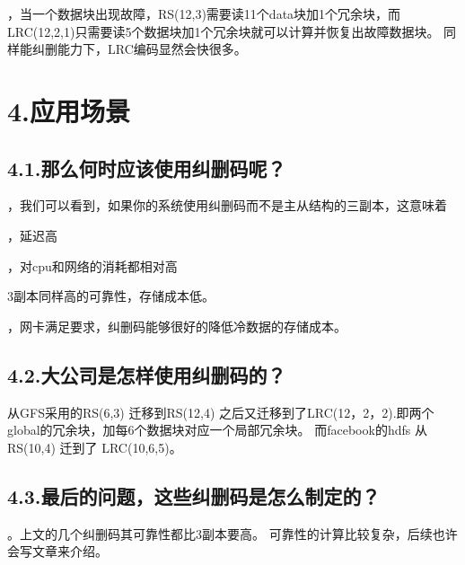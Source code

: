\documentclass{article}
\begin{document}
，当一个数据块出现故障，RS(12,3)需要读11个data块加1个冗余块，而LRC(12,2,1)只需要读5个数据块加1个冗余块就可以计算并恢复出故障数据块。
同样能纠删能力下，LRC编码显然会快很多。%

\section{4.\hspace*{0.5em}应用场景}\label{section}%

\subsection{4.1.\hspace*{0.5em}那么何时应该使用纠删码呢？}\label{section}%

，我们可以看到，如果你的系统使用纠删码而不是主从结构的三副本，这意味着%

\begin{itemize}[noitemsep,topsep=\mdcompacttopsep]%

，延迟高%

，对cpu和网络的消耗都相对高%

3副本同样高的可靠性，存储成本低。%
\end{itemize}%

，网卡满足要求，纠删码能够很好的降低冷数据的存储成本。%

\subsection{4.2.\hspace*{0.5em}大公司是怎样使用纠删码的？}\label{section}%

 从GFS采用的RS(6,3) 迁移到RS(12,4) 之后又迁移到了LRC(12，2，2).即两个global的冗余块，加每6个数据块对应一个局部冗余块。
而facebook的hdfs 从 RS(10,4) 迁到了 LRC(10,6,5)。%

\subsection{4.3.\hspace*{0.5em}最后的问题，这些纠删码是怎么制定的？}\label{section}%

。上文的几个纠删码其可靠性都比3副本要高。
可靠性的计算比较复杂，后续也许会写文章来介绍。%
\end{document}
